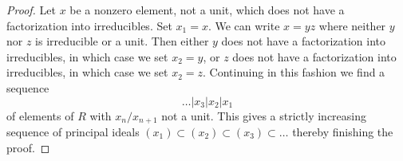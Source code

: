 \documentclass[10pt,a4paper]{amsart}
\theoremstyle{plain}
\theoremstyle{definition}
\theoremstyle{remark}
\numberwithin{equation}{subsection}
\begin{document}
\begin{proof}
Let $x$ be a nonzero element, not a unit, which does not have a
factorization into
irreducibles. Set $x_1 = x$. We can write $x = yz$ where neither
$y$ nor $z$ is irreducible or a unit.
Then either $y$ does not have a factorization
into irreducibles, in which case we set $x_2 = y$, or $z$ does not
have a factorization into irreducibles, in which case we set $x_2 = z$.
Continuing in this fashion we find a sequence
$$
\ldots | x_3 | x_2 | x_1
$$
of elements of $R$ with $x_n/x_{n + 1}$ not a unit.
This gives a strictly increasing sequence of principal ideals
$(x_1) \subset (x_2) \subset (x_3) \subset \ldots$ thereby finishing the proof.
\end{proof}
\end{document}
